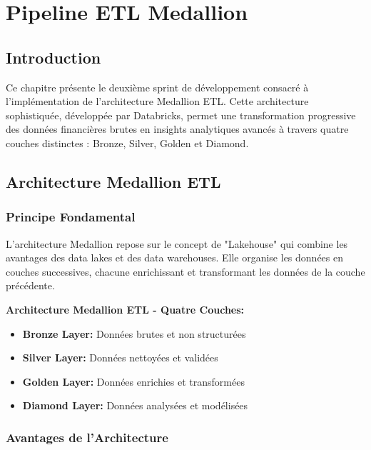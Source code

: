\chapter{Pipeline ETL Medallion}

\section*{Introduction}

Ce chapitre présente le deuxième sprint de développement consacré à l'implémentation de l'architecture Medallion ETL. Cette architecture sophistiquée, développée par Databricks, permet une transformation progressive des données financières brutes en insights analytiques avancés à travers quatre couches distinctes : Bronze, Silver, Golden et Diamond.

\section{Architecture Medallion ETL}

\subsection{Principe Fondamental}

L'architecture Medallion repose sur le concept de "Lakehouse" qui combine les avantages des data lakes et des data warehouses. Elle organise les données en couches successives, chacune enrichissant et transformant les données de la couche précédente.


\textbf{Architecture Medallion ETL - Quatre Couches:}
\begin{itemize}
    \item \textbf{Bronze Layer:} Données brutes et non structurées
    \item \textbf{Silver Layer:} Données nettoyées et validées
    \item \textbf{Golden Layer:} Données enrichies et transformées
    \item \textbf{Diamond Layer:} Données analysées et modélisées
\end{itemize}

\subsection{Avantages de l'Architecture}

